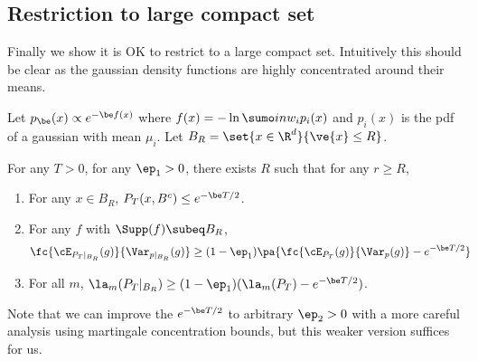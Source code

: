 
\subsection{Restriction to large compact set}

Finally we show it is OK to restrict to a large compact set. Intuitively this should be clear as the gaussian density functions are highly concentrated around their means.

\label{subsec:compactset}
\begin{lem}\label{lem:rest-large}
Let $p_\be(x)\propto e^{-\be f(x)}$ where $f(x)=-\ln \sumo in w_ip_i(x)$ and $p_i(x)$ is the pdf of a gaussian with mean $\mu_i$. Let $B_R=\set{x\in \R^d}{\ve{x}\le R}$. 

For any $T>0$, for any $\ep_1>0$, there exists %
$R$ such that for any $r\ge R$,
\begin{enumerate}
\item
For any $x\in B_R$, $P_T(x,B^c)\le e^{-\be T/2}$. 
\item For any $f$ with $\Supp(f)\subeq B_R$, 
\begin{align}\fc{\cE_{P_T|_{B_R}}(g)}{\Var_{p|_{B_R}}(g)}
&\ge (1-\ep_1) \pa{\fc{\cE_{P_T}(g)}{\Var_{p}(g)}-e^{-\be T/2}}
\end{align}
\item
For all $m$, $\la_m(P_T|_{B_R})\ge (1-\ep_1)(\la_m(P_T)-e^{-\be T/2})$.
\end{enumerate}
\end{lem}
Note that we can improve the $e^{-\be T/2}$ to arbitrary $\ep_2>0$ with a more careful analysis using martingale concentration bounds, but this weaker version suffices for us.
